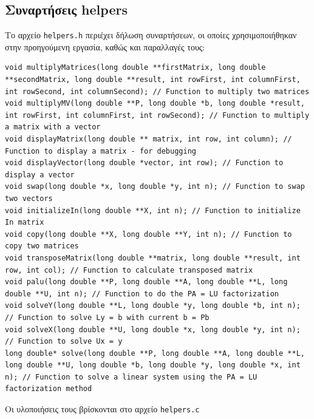 \documentclass[a4paper, 14pt]{article}   %
\begin{document}
\subsection*{Συναρτήσεις helpers}   %
	Το αρχείο \texttt{helpers.h} περιέχει δήλωση συναρτήσεων, οι οποίες χρησιμοποιήθηκαν στην προηγούμενη εργασία, καθώς και παραλλαγές τους:
\begin{lstlisting}
void multiplyMatrices(long double **firstMatrix, long double **secondMatrix, long double **result, int rowFirst, int columnFirst, int rowSecond, int columnSecond); // Function to multiply two matrices
void multiplyMV(long double **P, long double *b, long double *result, int rowFirst, int columnFirst, int rowSecond); // Function to multiply a matrix with a vector
void displayMatrix(long double ** matrix, int row, int column); // Function to display a matrix - for debugging
void displayVector(long double *vector, int row); // Function to display a vector
void swap(long double *x, long double *y, int n); // Function to swap two vectors
void initializeIn(long double **X, int n); // Function to initialize In matrix
void copy(long double **X, long double **Y, int n); // Function to copy two matrices
void transposeMatrix(long double **matrix, long double **result, int row, int col); // Function to calculate transposed matrix
void palu(long double **P, long double **A, long double **L, long double **U, int n); // Function to do the PA = LU factorization
void solveY(long double **L, long double *y, long double *b, int n); // Function to solve Ly = b with current b = Pb
void solveX(long double **U, long double *x, long double *y, int n); // Function to solve Ux = y
long double* solve(long double **P, long double **A, long double **L, long double **U, long double *b, long double *y, long double *x, int n); // Function to solve a linear system using the PA = LU factorization method
\end{lstlisting}
Οι υλοποιήσεις τους βρίσκονται στο αρχείο \texttt{helpers.c}
\end{document}
